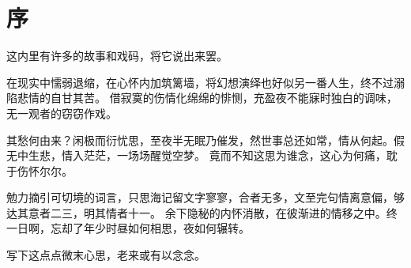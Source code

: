 \part{序}

\vspace*{2\ccwd}

\hspace*{2em} 这内里有许多的故事和戏码，将它说出来罢。

\vspace*{\ccwd}

\hspace*{2em} 在现实中懦弱退缩，在心怀内加筑篱墙，将幻想演绎也好似另一番人生，终不过溺陷悲情的自甘其苦。
借寂寞的伤情化绵绵的悱恻，充盈夜不能寐时独白的调味，无一观者的窃窃作戏。

\vspace*{\ccwd}

\hspace*{2em} 其愁何由来？闲极而衍忧思，至夜半无眠乃催发，然世事总还如常，情从何起。假无中生悲，情入茫茫，一场场醒觉空梦。
竟而不知这思为谁念，这心为何痛，耽于伤怀尔尔。

\vspace*{\ccwd}

\hspace*{2em} 勉力摘引可切境的词言，只思海记留文字寥寥，合者无多，文至完句情离意偏，够达其意者二三，明其情者十一。
余下隐秘的内怀消散，在彼渐进的情移之中。终一日啊，忘却了年少时昼如何相思，夜如何辗转。

\vspace*{\ccwd}

\hspace*{2em} 写下这点点微末心思，老来或有以念念。

\newpage